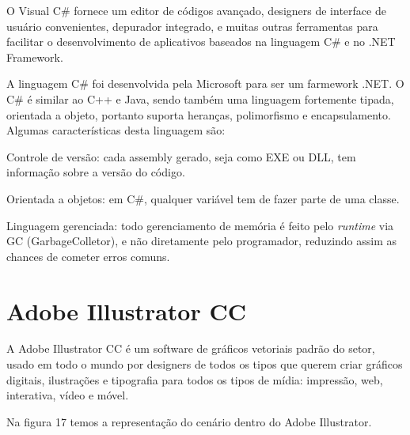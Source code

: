 O Visual C\# fornece um editor de códigos avançado, designers de interface de usuário convenientes, depurador integrado, e muitas outras ferramentas para facilitar o desenvolvimento de aplicativos baseados na linguagem C\# e no .NET Framework. 

A linguagem C\# foi desenvolvida pela Microsoft para ser um farmework .NET. 
O C\# é similar ao C++ e Java, sendo também uma linguagem fortemente tipada, orientada a objeto, portanto suporta heranças, polimorfismo e encapsulamento. 
Algumas características desta linguagem são: 

\begin{alineascomponto}
	\item Controle de versão: cada assembly gerado, seja como EXE ou DLL, tem informação sobre a versão do código. 

	\item Orientada a objetos: em C\#, qualquer variável tem de fazer parte de uma classe.  

	\item Linguagem gerenciada: todo gerenciamento de memória é feito pelo \textit{runtime} via GC (GarbageColletor), e não diretamente pelo programador, reduzindo assim as chances de cometer erros comuns.
\end{alineascomponto}
\cite{mcs}

\section{Adobe Illustrator CC}
\label{sec:Adobe-Illustrato-CC}

A Adobe Illustrator CC é um software de gráficos vetoriais padrão do setor, usado em todo o mundo por designers de todos os tipos que querem criar gráficos digitais, ilustrações e tipografia para todos os tipos de mídia: impressão, web, interativa, vídeo e móvel. \cite{adb}

Na figura 17 temos a representação do cenário dentro do Adobe Illustrator.

\begin{figure}[h!]
		\centering
	\end{figure}
	
